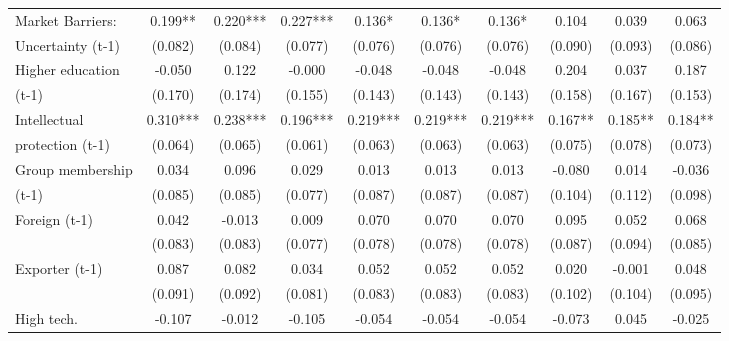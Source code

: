 \begin{table}[htbp]
\begin{tabular}{l*{9}{c}}
Market Barriers:    &       0.199** &       0.220***&       0.227***&       0.136*  &       0.136*  &       0.136*  &       0.104   &       0.039   &       0.063   \\
Uncertainty (t-1)   &     (0.082)   &     (0.084)   &     (0.077)   &     (0.076)   &     (0.076)   &     (0.076)   &     (0.090)   &     (0.093)   &     (0.086)   \\
Higher education    &      -0.050   &       0.122   &      -0.000   &      -0.048   &      -0.048   &      -0.048   &       0.204   &       0.037   &       0.187   \\
(t-1)               &     (0.170)   &     (0.174)   &     (0.155)   &     (0.143)   &     (0.143)   &     (0.143)   &     (0.158)   &     (0.167)   &     (0.153)   \\
Intellectual        &       0.310***&       0.238***&       0.196***&       0.219***&       0.219***&       0.219***&       0.167** &       0.185** &       0.184** \\
protection (t-1)    &     (0.064)   &     (0.065)   &     (0.061)   &     (0.063)   &     (0.063)   &     (0.063)   &     (0.075)   &     (0.078)   &     (0.073)   \\
Group membership    &       0.034   &       0.096   &       0.029   &       0.013   &       0.013   &       0.013   &      -0.080   &       0.014   &      -0.036   \\
(t-1)               &     (0.085)   &     (0.085)   &     (0.077)   &     (0.087)   &     (0.087)   &     (0.087)   &     (0.104)   &     (0.112)   &     (0.098)   \\
Foreign (t-1)       &       0.042   &      -0.013   &       0.009   &       0.070   &       0.070   &       0.070   &       0.095   &       0.052   &       0.068   \\
                    &     (0.083)   &     (0.083)   &     (0.077)   &     (0.078)   &     (0.078)   &     (0.078)   &     (0.087)   &     (0.094)   &     (0.085)   \\
Exporter (t-1)      &       0.087   &       0.082   &       0.034   &       0.052   &       0.052   &       0.052   &       0.020   &      -0.001   &       0.048   \\
                    &     (0.091)   &     (0.092)   &     (0.081)   &     (0.083)   &     (0.083)   &     (0.083)   &     (0.102)   &     (0.104)   &     (0.095)   \\
High tech.          &      -0.107   &      -0.012   &      -0.105   &      -0.054   &      -0.054   &      -0.054   &      -0.073   &       0.045   &      -0.025   \\

\end{tabular}
\end{table}
